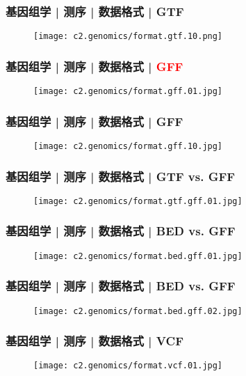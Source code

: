 \begin{frame}
  \frametitle{基因组学 | 测序 | 数据格式 | GTF}
  \begin{figure}
    \centering
    \texttt{[image: c2.genomics/format.gtf.10.png]}
  \end{figure}
\end{frame}
    
\begin{frame}
  \frametitle{基因组学 | 测序 | 数据格式 | \textcolor{red}{GFF}}
  \begin{figure}
    \centering
    \texttt{[image: c2.genomics/format.gff.01.jpg]}
  \end{figure}
\end{frame}
    
\begin{frame}
  \frametitle{基因组学 | 测序 | 数据格式 | GFF}
  \begin{figure}
    \centering
    \texttt{[image: c2.genomics/format.gff.10.jpg]}
  \end{figure}
\end{frame}
    
\begin{frame}
  \frametitle{基因组学 | 测序 | 数据格式 | GTF vs. GFF}
  \begin{figure}
    \centering
    \texttt{[image: c2.genomics/format.gtf.gff.01.jpg]}
  \end{figure}
\end{frame}

\begin{frame}
  \frametitle{基因组学 | 测序 | 数据格式 | BED vs. GFF}
  \begin{figure}
    \centering
    \texttt{[image: c2.genomics/format.bed.gff.01.jpg]}
  \end{figure}
\end{frame}
    
\begin{frame}
  \frametitle{基因组学 | 测序 | 数据格式 | BED vs. GFF}
  \begin{figure}
    \centering
    \texttt{[image: c2.genomics/format.bed.gff.02.jpg]}
  \end{figure}
\end{frame}
    
\begin{frame}
  \frametitle{基因组学 | 测序 | 数据格式 | VCF}
  \begin{figure}
    \centering
    \texttt{[image: c2.genomics/format.vcf.01.jpg]}
  \end{figure}
\end{frame}
    
